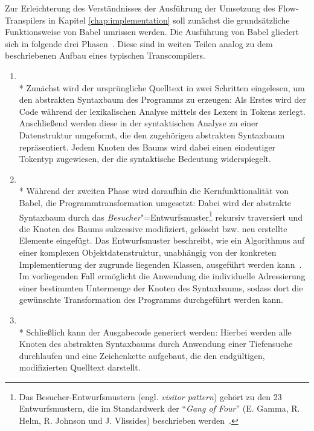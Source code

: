 Zur Erleichterung des Verständnisses der Ausführung der Umsetzung des Flow-Transpilers in Kapitel \ref{chap:implementation} soll zunächst die grundsätzliche Funktionsweise von Babel umrissen werden. Die Ausführung von Babel gliedert sich in folgende drei Phasen~\autocite{BABEL:HANDBOOK}. Diese sind in weiten Teilen analog zu dem beschriebenen Aufbau eines typischen Transcompilers.

\begin{enumerate}
  \item {}\\*
    Zunächst wird der ursprüngliche Quelltext in zwei Schritten eingelesen, um den abstrakten Syntaxbaum des Programms zu erzeugen: Als Erstes wird der Code während der lexikalischen Analyse mittels des Lexers in Tokens zerlegt. Anschließend werden diese in der syntaktischen Analyse zu einer Datenstruktur umgeformt, die den zugehörigen abstrakten Syntaxbaum repräsentiert. Jedem Knoten des Baums wird dabei einen eindeutiger Tokentyp zugewiesen, der die syntaktische Bedeutung widerspiegelt.
    \bigbreak
  \item {}\\*
    Während der zweiten Phase wird daraufhin die Kernfunktionalität von Babel, die Programmtransformation umgesetzt: Dabei wird der abstrakte Syntaxbaum durch das \emph{Besucher}"=Entwurfsmuster\footnote{Das Besucher-Entwurfsmustern (engl. \textit{visitor pattern}) gehört zu den 23 Entwurfsmustern, die im Standardwerk  der \enquote{\textit{Gang of Four}} (E. Gamma, R. Helm, R. Johnson und J. Vlissides) beschrieben werden~\autocite[306\psqq]{GAMMA:1994}.} rekursiv traversiert und die Knoten des Baums sukzessive modifiziert, gelöscht bzw. neu erstellte Elemente eingefügt. Das Entwurfsmuster beschreibt, wie ein Algorithmus auf einer komplexen Objektdatenstruktur, unabhängig von der konkreten Implementierung der zugrunde liegenden Klassen, ausgeführt werden kann~\autocite[634\psq]{FREEMAN:2004}. Im vorliegenden Fall ermöglicht die Anwendung die individuelle Adressierung einer bestimmten Untermenge der Knoten des Syntaxbaums, sodass dort die gewünschte Transformation des Programms durchgeführt werden kann.
    \bigbreak
  \item {}\\*
    Schließlich kann der Ausgabecode generiert werden: Hierbei werden alle Knoten des abstrakten Syntaxbaums durch Anwendung einer Tiefensuche durchlaufen und eine Zeichenkette aufgebaut, die den endgültigen, modifizierten Quelltext darstellt.
\end{enumerate}

